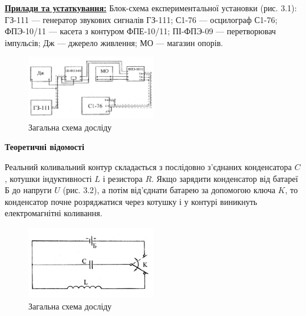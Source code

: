 \documentclass[12pt,a4paper]{article}
\begin{document}
    \textbf{\underline{Прилади та устаткування:}} Блок-схема експериментальної установки (рис. 3.1): ГЗ-111 --- генератор звукових сигналів ГЗ-111; С1-76 --- осцилограф С1-76;
    ФПЭ-10/11 --- касета з контуром ФПЕ-10/11; ПІ-ФПЭ-09 --- перетворювач імпульсів; Дж --- джерело живлення; МО --- магазин опорів.

    \begin{figure}[h!]

        \setcounter{figure}{0}                  %
        \renewcommand{\thefigure}{3.\arabic{figure}} %

        \centering
        \includegraphics[width=0.5\textwidth]{3.1.png}
        \caption{Загальна схема досліду}
        \label{fig1:schema}
    \end{figure}


    \begin{center}
        \textbf{\large Теоретичні відомості}
    \end{center}

    \setlength{\parindent}{1.5em}

    Реальний коливальний контур складається з послідовно з’єднаних конденсатора $C$, котушки індуктивності $L$
    і резистора $R$. Якщо зарядити конденсатор від батареї Б до напруги $U$ (рис. 3.2), а потім від’єднати батарею
    за допомогою ключа $K$, то конденсатор почне розряджатися через котушку і у контурі виникнуть електромагнітні коливання.

    \begin{figure}[h!]

        \renewcommand{\thefigure}{3.\arabic{figure}} %

        \centering
        \includegraphics[width=0.5\textwidth]{3.2.png}
        \caption{Загальна схема досліду}
        \label{fig2:schema}

    \end{figure}
\end{document}
